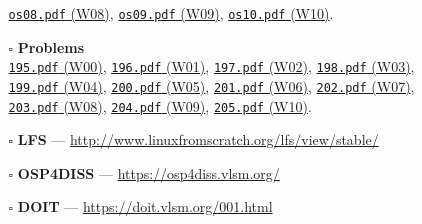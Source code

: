 \begin{frame}[fragile]
\begin{itemize}
\begin{itemize}
{                 \href{https://os.vlsm.org/Slides/os08.pdf}{\texttt{os08.pdf} (W08)},
                 \href{https://os.vlsm.org/Slides/os09.pdf}{\texttt{os09.pdf} (W09)},
                 \href{https://os.vlsm.org/Slides/os10.pdf}{\texttt{os10.pdf} (W10)}.
                 }
\item[$\square$] \textbf{Problems}\\
                 {\scriptsize%
                 \href{https://rms46.vlsm.org/2/195.pdf}{\texttt{195.pdf} (W00)},
                 \href{https://rms46.vlsm.org/2/196.pdf}{\texttt{196.pdf} (W01)},
                 \href{https://rms46.vlsm.org/2/197.pdf}{\texttt{197.pdf} (W02)},
                 \href{https://rms46.vlsm.org/2/198.pdf}{\texttt{198.pdf} (W03)},\\
                 \href{https://rms46.vlsm.org/2/199.pdf}{\texttt{199.pdf} (W04)},
                 \href{https://rms46.vlsm.org/2/200.pdf}{\texttt{200.pdf} (W05)},
                 \href{https://rms46.vlsm.org/2/201.pdf}{\texttt{201.pdf} (W06)},
                 \href{https://rms46.vlsm.org/2/202.pdf}{\texttt{202.pdf} (W07)},\\
                 \href{https://rms46.vlsm.org/2/203.pdf}{\texttt{203.pdf} (W08)},
                 \href{https://rms46.vlsm.org/2/204.pdf}{\texttt{204.pdf} (W09)},
                 \href{https://rms46.vlsm.org/2/205.pdf}{\texttt{205.pdf} (W10)}.}
\item[$\square$] \textbf{LFS} --- \url{http://www.linuxfromscratch.org/lfs/view/stable/}
\item[$\square$] \textbf{OSP4DISS} --- \url{https://osp4diss.vlsm.org/}
\item[$\square$] \textbf{DOIT} --- \url{https://doit.vlsm.org/001.html}
\end{itemize}
\end{itemize}
\end{frame}

